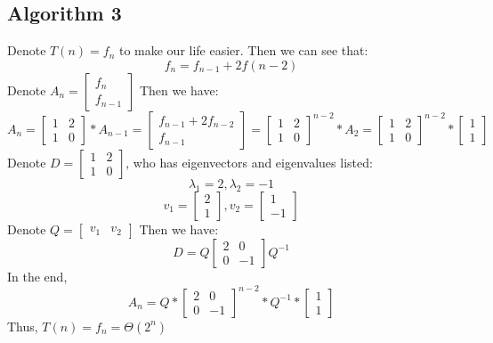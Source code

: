 \documentclass{article}
\begin{document}
	\subsection*{Algorithm 3}
		Denote $T(n) = f_n$ to make our life easier.
		Then we can see that:
		$$ f_n = f_{n-1} + 2f(n-2)$$
		Denote $A_n = 
			\begin{bmatrix} f_n \\ f_{n-1}\end{bmatrix}$
		Then we have:
		$$ A_n 
			= \begin{bmatrix} 1 & 2 \\ 1 & 0 \end{bmatrix} * A_{n-1}
			= \begin{bmatrix} f_{n-1} + 2f_{n-2} \\ f_{n-1} \end{bmatrix}
			= \begin{bmatrix} 1 & 2 \\ 1 & 0 \end{bmatrix}^{n-2} * A_2
			= \begin{bmatrix} 1 & 2 \\ 1 & 0 \end{bmatrix}^{n-2} * \begin{bmatrix} 1 \\ 1 \end{bmatrix}
		$$
		Denote $D = \begin{bmatrix} 1 & 2 \\ 1 & 0 \end{bmatrix}$, who has eigenvectors and eigenvalues listed:
		$$ \lambda_1 = 2, \lambda_2 = -1 $$
		$$ v_1 = \begin{bmatrix} 2 \\ 1\end{bmatrix},
			v_2 = \begin{bmatrix} 1 \\ -1\end{bmatrix}
		$$
		Denote $ Q = \begin{bmatrix} v_1 & v_2 \end{bmatrix} $
		Then we have:
		$$ D = Q \begin{bmatrix} 2 & 0 \\ 0 & -1 \end{bmatrix} Q^{-1}$$
		In the end, $$A_n 
			= Q
				* \begin{bmatrix} 2 & 0 \\ 0 & -1 \end{bmatrix}^{n-2}
				* Q^{-1}
				* \begin{bmatrix} 1 \\ 1 \end{bmatrix}$$
		Thus, $T(n) = f_n = \Theta(2^n) $
\end{document}
